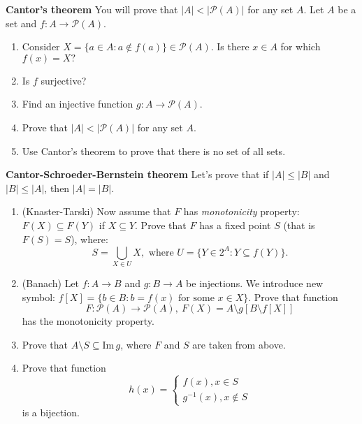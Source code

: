 \begin{prob}
	\textbf{Cantor's theorem} You will prove that $|A|<\left|\mathcal P(A)\right|$ for any set $A$. Let $A$ be a set and $f:A\to \mathcal P(A).$
	\begin{enumerate}
		\item Consider $X=\{a\in A : a\notin f(a)\}\in \mathcal P(A)$. Is there $x\in A$ for which $f(x)=X?$
		\item Is $f$ surjective?
		\item Find an injective function $g: A\to \mathcal P(A)$.
		\item Prove that $|A| < |\mathcal P(A)|$ for any set $A$.
		\item Use Cantor's theorem to prove that there is no set of all sets.
	\end{enumerate}
\end{prob}

\begin{prob}
	\textbf{Cantor-Schroeder-Bernstein theorem} Let's prove that if $|A|\le|B|$ and $|B|\le |A|$, then $|A|=|B|$.
	\begin{enumerate}
		\item (Knaster-Tarski) Now assume that $F$ has \textit{monotonicity} property: $F(X)\subseteq F(Y)$ if $X\subseteq Y$.
			Prove that $F$ has a fixed point $S$ (that is $F(S)=S$), where:
			$$S=\bigcup_{X\in U} X, \text{~where~} U= \{Y\in 2^A : Y\subseteq f(Y)\}.$$
		\item (Banach) Let $f: A\to B$ and $g:B\to A$ be injections.
			We introduce new symbol: $f[X]=\{b\in B : b=f(x) \text{ for some } x\in X\}$. Prove that
			function $$F:\mathcal P(A)\to \mathcal P(A),~F(X)=A\setminus g[B\setminus f[X]]$$
			has the monotonicity property.
    \item Prove that $A\setminus S\subseteq \text{Im}\,g$, where
      $F$ and $S$ are taken from above.
		\item Prove that function
			$$h(x) =
				\begin{cases}
					f(x), x\in S\\
					g^{-1}(x), x \notin S
				\end{cases}
			 $$
			 is a bijection.
	\end{enumerate}
\end{prob}
